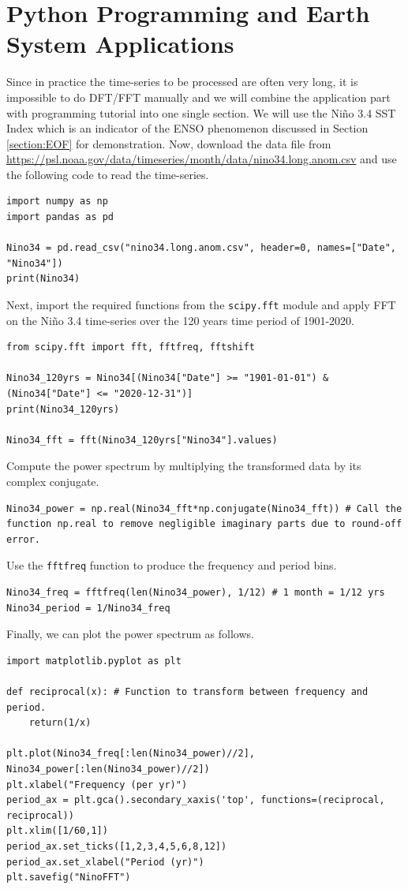 \section{Python Programming and Earth System Applications}

Since in practice the time-series to be processed are often very long, it is impossible to do DFT/FFT manually and we will combine the application part with programming tutorial into one single section. We will use the Niño 3.4 SST Index which is an indicator of the ENSO phenomenon discussed in Section \ref{section:EOF} for demonstration. Now, download the data file from \href{https://psl.noaa.gov/data/timeseries/month/data/nino34.long.anom.csv}{https://psl.noaa.gov/data/timeseries/month/data/nino34.long.anom.csv} and use the following code to read the time-series.
\begin{lstlisting}
import numpy as np
import pandas as pd

Nino34 = pd.read_csv("nino34.long.anom.csv", header=0, names=["Date", "Nino34"])
print(Nino34)    
\end{lstlisting}
Next, import the required functions from the \verb|scipy.fft| module and apply FFT on the Niño 3.4 time-series over the 120 years time period of 1901-2020.
\begin{lstlisting}
from scipy.fft import fft, fftfreq, fftshift

Nino34_120yrs = Nino34[(Nino34["Date"] >= "1901-01-01") & (Nino34["Date"] <= "2020-12-31")]
print(Nino34_120yrs)

Nino34_fft = fft(Nino34_120yrs["Nino34"].values) 
\end{lstlisting}
Compute the power spectrum by multiplying the transformed data by its complex conjugate.
\begin{lstlisting}
Nino34_power = np.real(Nino34_fft*np.conjugate(Nino34_fft)) # Call the function np.real to remove negligible imaginary parts due to round-off error.
\end{lstlisting}
Use the \verb|fftfreq| function to produce the frequency and period bins.
\begin{lstlisting}
Nino34_freq = fftfreq(len(Nino34_power), 1/12) # 1 month = 1/12 yrs
Nino34_period = 1/Nino34_freq
\end{lstlisting}
Finally, we can plot the power spectrum as follows.
\begin{lstlisting}
import matplotlib.pyplot as plt

def reciprocal(x): # Function to transform between frequency and period.
    return(1/x)

plt.plot(Nino34_freq[:len(Nino34_power)//2], Nino34_power[:len(Nino34_power)//2])
plt.xlabel("Frequency (per yr)")
period_ax = plt.gca().secondary_xaxis('top', functions=(reciprocal, reciprocal))
plt.xlim([1/60,1])
period_ax.set_ticks([1,2,3,4,5,6,8,12])
period_ax.set_xlabel("Period (yr)")
plt.savefig("NinoFFT")
\end{lstlisting}
